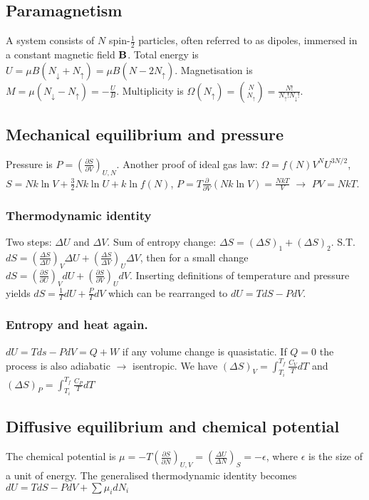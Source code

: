 \documentclass[11pt,twocolumn]{amsart}
\begin{document}
\subsection{Paramagnetism}
A system consists of $N$ spin-$\frac{1}{2}$ particles, often referred to as dipoles, immersed in a constant magnetic field $\vb{B}$. Total energy is $U=\mu B(N_\downarrow + N_\uparrow) = \mu B (N-2N_\uparrow)$. Magnetisation is $M=\mu(N_\downarrow - N_\uparrow) = -\frac{U}{B}$. Multiplicity is $\Omega(N_\uparrow) = \binom{N}{N_\uparrow}=\frac{N!}{N_\uparrow!N_\downarrow!}$.
\subsection{Mechanical equilibrium and pressure}
Pressure is $P = \left(\frac{\partial S}{\partial V} \right)_{U,N}$. Another proof of ideal gas law: $\Omega = f(N)V^NU^{3N/2}$, $S = Nk\ln V + \frac{3}{2}Nk \ln U + k \ln f(N)$, $P=T \frac{\partial}{\partial V}(Nk\ln V) = \frac{NkT}{V}$ $\rightarrow$ $PV = NkT$.
\subsubsection{Thermodynamic identity}
Two steps: $\Delta U$ and $\Delta V$. Sum of entropy change: $\Delta S = (\Delta S)_1 + (\Delta S)_2$. S.T. $dS = \left(\frac{\Delta S}{\Delta U}\right)_V \Delta U + \left(\frac{\Delta S}{\Delta V}\right)_U \Delta V$, then for a small change $dS = \left(\frac{\partial S}{\partial U}\right)_V d U + \left(\frac{\partial S}{\partial V}\right)_U d V$. Inserting definitions of temperature and pressure yields $dS = \frac{1}{T}dU + \frac{P}{T}dV$ which can be rearranged to $dU = TdS - PdV$.
\subsubsection{Entropy and heat again.}
$dU = Tds - PdV = Q + W$ if any volume change is quasistatic. If $Q = 0$ the process is also adiabatic $\rightarrow$ isentropic. We have $(\Delta S)_V = \int_{T_i}^{T_f}\frac{C_V}{T}dT$ and  $(\Delta S)_P = \int_{T_i}^{T_f}\frac{C_P}{T}dT$
\subsection{Diffusive equilibrium and chemical potential}
The chemical potential is $\mu = -T\left(\frac{\partial S}{\partial N}\right)_{U,V} = \left( \frac{\Delta U}{\Delta N}\right)_S = -\epsilon$, where $\epsilon$ is the size of a unit of energy. The generalised thermodynamic identity becomes $dU = TdS - PdV + \sum \mu_i dN_i$
\end{document}
